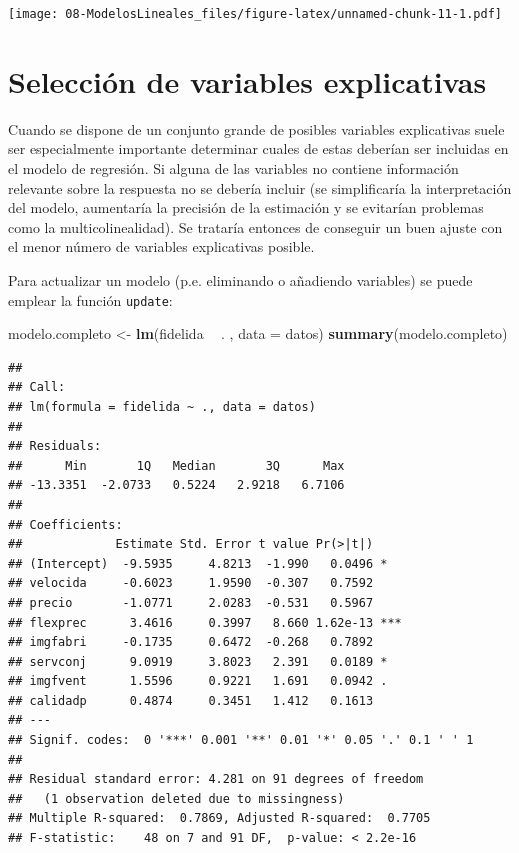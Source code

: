 \documentclass[]{book}
\newenvironment{Shaded}{\begin{snugshade}}{\end{snugshade}}
\newcommand{\KeywordTok}[1]{\textcolor[rgb]{0.13,0.29,0.53}{\textbf{#1}}}
\newcommand{\DataTypeTok}[1]{\textcolor[rgb]{0.13,0.29,0.53}{#1}}
\newcommand{\StringTok}[1]{\textcolor[rgb]{0.31,0.60,0.02}{#1}}
\newcommand{\OperatorTok}[1]{\textcolor[rgb]{0.81,0.36,0.00}{\textbf{#1}}}
\newcommand{\NormalTok}[1]{#1}
\begin{document}
\texttt{[image: 08-ModelosLineales\_files/figure-latex/unnamed-chunk-11-1.pdf]}

\section{Selección de variables
explicativas}\label{seleccion-de-variables-explicativas}

Cuando se dispone de un conjunto grande de posibles variables
explicativas suele ser especialmente importante determinar cuales de
estas deberían ser incluidas en el modelo de regresión. Si alguna de las
variables no contiene información relevante sobre la respuesta no se
debería incluir (se simplificaría la interpretación del modelo,
aumentaría la precisión de la estimación y se evitarían problemas como
la multicolinealidad). Se trataría entonces de conseguir un buen ajuste
con el menor número de variables explicativas posible.

Para actualizar un modelo (p.e. eliminando o añadiendo variables) se
puede emplear la función \texttt{update}:

\begin{Shaded}
\begin{Highlighting}[]
\NormalTok{modelo.completo <-}\StringTok{ }\KeywordTok{lm}\NormalTok{(fidelida }\OperatorTok{~}\StringTok{ }\NormalTok{. , }\DataTypeTok{data =}\NormalTok{ datos)}
\KeywordTok{summary}\NormalTok{(modelo.completo)}
\end{Highlighting}
\end{Shaded}

\begin{verbatim}
## 
## Call:
## lm(formula = fidelida ~ ., data = datos)
## 
## Residuals:
##      Min       1Q   Median       3Q      Max 
## -13.3351  -2.0733   0.5224   2.9218   6.7106 
## 
## Coefficients:
##             Estimate Std. Error t value Pr(>|t|)    
## (Intercept)  -9.5935     4.8213  -1.990   0.0496 *  
## velocida     -0.6023     1.9590  -0.307   0.7592    
## precio       -1.0771     2.0283  -0.531   0.5967    
## flexprec      3.4616     0.3997   8.660 1.62e-13 ***
## imgfabri     -0.1735     0.6472  -0.268   0.7892    
## servconj      9.0919     3.8023   2.391   0.0189 *  
## imgfvent      1.5596     0.9221   1.691   0.0942 .  
## calidadp      0.4874     0.3451   1.412   0.1613    
## ---
## Signif. codes:  0 '***' 0.001 '**' 0.01 '*' 0.05 '.' 0.1 ' ' 1
## 
## Residual standard error: 4.281 on 91 degrees of freedom
##   (1 observation deleted due to missingness)
## Multiple R-squared:  0.7869, Adjusted R-squared:  0.7705 
## F-statistic:    48 on 7 and 91 DF,  p-value: < 2.2e-16
\end{verbatim}
\end{document}
